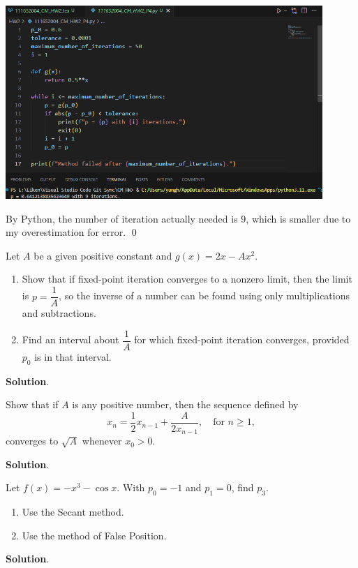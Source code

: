 \documentclass[11pt]{article}
\theoremstyle{break}
\numberwithin{equation}{theorem}
\begin{document}
\begin{center}
    \includegraphics[width=0.9\textwidth]{problem_4_py.png}
\end{center}
By Python, the number of iteration actually needed is 9, which is smaller due to my overestimation for error. \qed


\newpage
\begin{problem}\label{problem 5}
    Let $A$ be a given positive constant and $g(x)=2x-Ax^2$.
    \begin{enumerate}
        \item Show that if fixed-point iteration converges to a nonzero limit, then the limit is $p=\dfrac{1}{A}$, so the inverse of a number can be found using only multiplications and subtractions.
        \item Find an interval about $\dfrac{1}{A}$ for which fixed-point iteration converges, provided $p_0$ is in that interval.
    \end{enumerate}
\end{problem}
\textbf{Solution}.


\newpage
\begin{problem}\label{problem 6}
    Show that if $A$ is any positive number, then the sequence defined by
    \begin{equation*}
        x_n=\dfrac{1}{2}x_{n-1}+\dfrac{A}{2x_{n-1}},\quad\text{for $n\geq 1$},
    \end{equation*}
    converges to $\sqrt{A}$ whenever $x_0>0$.
\end{problem}
\textbf{Solution}.


\newpage
\begin{problem}\label{problem 7}
    Let $f(x)=-x^3-\cos x$. With $p_0=-1$ and $p_1=0$, find $p_3$.
    \begin{enumerate}
        \item Use the Secant method.
        \item Use the method of False Position.
    \end{enumerate}
\end{problem}
\textbf{Solution}.
\end{document}
